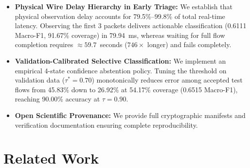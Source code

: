 \documentclass[conference]{IEEEtran}
\begin{document}
\begin{itemize}
    \item \textbf{Physical Wire Delay Hierarchy in Early Triage:} We establish that physical observation delay accounts for 79.5\%--99.8\% of total real-time latency. Observing the first 3 packets delivers actionable classification (0.6111 Macro-F1, 91.67\% coverage) in 79.94~ms, whereas waiting for full flow completion requires $\approx 59.7$~seconds ($746\times$ longer) and fails completely.
    \item \textbf{Validation-Calibrated Selective Classification:} We implement an empirical 4-state confidence abstention policy. Tuning the threshold on validation data ($\tau^* = 0.70$) monotonically reduces error among accepted test flows from 45.83\% down to 26.92\% at 54.17\% coverage (0.6515 Macro-F1), reaching 90.00\% accuracy at $\tau = 0.90$.
    \item \textbf{Open Scientific Provenance:} We provide full cryptographic manifests and verification documentation ensuring complete reproducibility.
\end{itemize}

\section{Related Work}
\label{sec:related}
\end{document}
